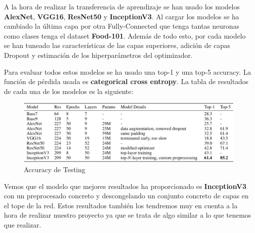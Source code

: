 \vspace{3 mm}

A la hora de realizar la transferencia de aprendizaje se han usado los modelos \textbf{AlexNet}, \textbf{VGG16}, \textbf{ResNet50} y \textbf{InceptionV3}. Al cargar los modelos se ha cambiado la última capa por otra Fully-Connected que tenga tantas neuronas como clases tenga el dataset \textbf{Food-101}. Además de todo esto, por cada modelo se han tuneado las características de las capas superiores, adición de capas Dropout y estimación de los hiperparámetros del optimizador.

\vspace{3 mm}

Para evaluar todos estos modelos se ha usado una top-1 y una top-5 accuracy. La función de pérdida usada es \textbf{categorical cross entropy}. La tabla de resultados de cada una de los modelos es la siguiente:

\vspace{5 mm}

\begin{figure}[H]
  \centering
  \includegraphics[width=1\linewidth]{Imagenes/tablapaper3.png}
  \caption{Accuracy de Testing}
  \label{fig:sub-first}
\end{figure}

\vspace{5 mm} 

Vemos que el modelo que mejores resultados ha proporcionado es \textbf{InceptionV3} con un preprocesado concreto y descongelando un conjunto concreto de capas en el tope de la red. Estos resultados también los tendremos muy en cuenta a la hora de realizar nuestro proyecto ya que se trata de algo similar a lo que tenemos que realizar.
